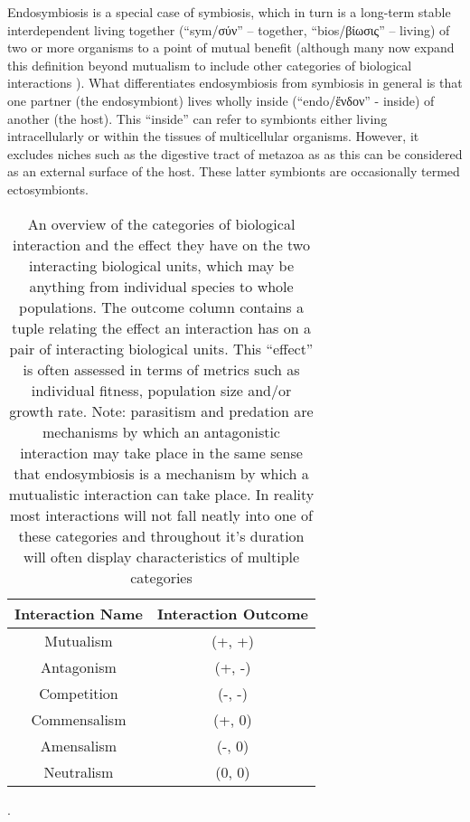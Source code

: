 Endosymbiosis is a special case of symbiosis, which in turn is a long-term stable interdependent 
living together (``sym/σύν'' -- together, ``bios/βίωσις'' -- living) of two or more 
organisms to a point of mutual benefit \citep{DeBary1869,Pound1893} (although many now expand 
this definition beyond mutualism to include other categories of biological interactions \citep{Leung2008,OMalley2015}).
What differentiates endosymbiosis from symbiosis in general is that one partner (the endosymbiont) lives wholly
inside (``endo/ἔνδον'' - inside) of another (the host). This ``inside'' can refer to symbionts either living intracellularly
or within the tissues of multicellular organisms.  However, it excludes niches such as the digestive tract of metazoa as 
as this can be considered as an external surface of the host. These latter symbionts are occasionally termed ectosymbionts.
\begin{table}[h]
    \begin{tabular}{@{}cc@{}}
        \toprule
        \multicolumn{1}{r}{\textbf{Interaction Name}} & \multicolumn{1}{l}{\textbf{Interaction Outcome}} \\ 
        \midrule
        \multicolumn{1}{|c|}{Mutualism}               & \multicolumn{1}{c|}{(+, +)}                      \\
        \multicolumn{1}{|c|}{Antagonism}              & \multicolumn{1}{c|}{(+, -)}                      \\
        \multicolumn{1}{|c|}{Competition}             & \multicolumn{1}{c|}{(-, -)}                      \\
        \multicolumn{1}{|c|}{Commensalism}            & \multicolumn{1}{c|}{(+, 0)}                      \\
        \multicolumn{1}{|c|}{Amensalism}              & \multicolumn{1}{c|}{(-, 0)}                      \\
        \multicolumn{1}{|c|}{Neutralism}              & \multicolumn{1}{c|}{(0, 0)}                      \\ 
        \bottomrule
    \end{tabular}
    \caption{An overview of the categories of biological interaction and the effect they have on the two interacting
        biological units, which may be anything from individual species to whole populations. The outcome column 
        contains a tuple relating the effect an interaction has on a pair of interacting biological units. 
        This ``effect'' is often assessed in terms of metrics such as individual fitness, population size and/or
        growth rate.
        Note: parasitism and predation are mechanisms by which an antagonistic interaction may take place \citep{Abrams1987}
        in the same sense that endosymbiosis is a mechanism by which a mutualistic interaction can take place.
        In reality most interactions will not fall neatly into one of these categories and throughout it's duration
        will often display characteristics of multiple categories \citep{Leung2008}}. 
    \label{table:biointeractions}
\end{table}

